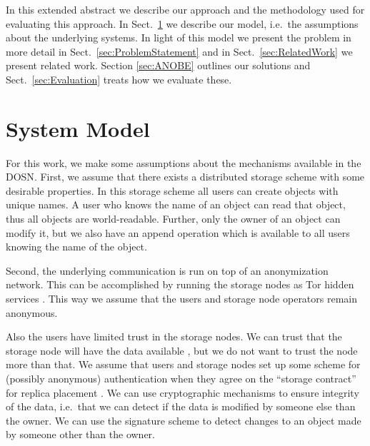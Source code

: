 In this extended abstract we describe our approach and the methodology used for 
evaluating this approach.
In Sect.~\ref{sec:SystemModel} we describe our model, i.e.~the assumptions 
about the underlying systems.
In light of this model we present the problem in more detail in 
Sect.~\ref{sec:ProblemStatement} and in Sect.~\ref{sec:RelatedWork} we present 
related work.
Section \ref{sec:ANOBE} outlines our solutions and Sect.~\ref{sec:Evaluation} 
treats how we evaluate these.


\section{System Model}\label{sec:SystemModel}

For this work, we make some assumptions about the mechanisms available in the 
\ac{DOSN}.
First, we assume that there exists a distributed storage scheme with some 
desirable properties.
In this storage scheme all users can create objects with unique names.
A user who knows the name of an object can read that object, thus all objects 
are world-readable.
Further, only the owner of an object can modify it, but we also have an append 
operation which is available to all users knowing the name of the object.

Second, the underlying communication is run on top of an anonymization 
network.
This can be accomplished by running the storage nodes as Tor hidden services 
\cite{tor}.
This way we assume that the users and storage node operators remain anonymous.

Also the users have limited trust in the storage nodes.
We can trust that the storage node will have the data available 
\cite{dataavailability,replicaplacement}, but we do not want to trust the node 
more than that.
We assume that users and storage nodes set up some scheme for (possibly 
anonymous) authentication when they agree on the \enquote{storage contract} for 
replica placement \cite{replicaplacement}.
We can use cryptographic mechanisms to ensure integrity of the data, i.e.~that 
we can detect if the data is modified by someone else than the owner.
We can use the signature scheme to detect changes to an object made by someone 
other than the owner.

